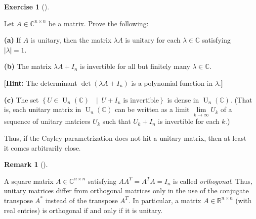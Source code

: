 \documentclass[numbers=enddot,12pt,final,onecolumn,notitlepage]{scrartcl}%
\newcounter{exer}
\numberwithin{exer}{subsection}
\theoremstyle{definition}
\newtheorem{remk}[theo]{Remark}
\newenvironment{remark}[1][]
{\begin{remk}[#1]\begin{leftbar}}
{\end{leftbar}\end{remk}}
\newtheorem{exmp}[exer]{Exercise}
\newenvironment{exercise}[1][]
{\begin{exmp}[#1]\begin{leftbar}}
{\end{leftbar}\end{exmp}}
\begin{document}
\begin{exercise}
\label{exe.unitary.skew-herm.2} Let $A\in\mathbb{C}^{n\times n}$ be a
matrix. Prove the following: \medskip

\textbf{(a)} If $A$ is unitary, then the matrix $\lambda A$ is unitary for
each $\lambda\in\mathbb{C}$ satisfying $\left\vert \lambda\right\vert =1$.
\medskip

\textbf{(b)} The matrix $\lambda A+I_{n}$ is invertible for all but finitely
many $\lambda\in\mathbb{C}$. \medskip

[\textbf{Hint:} The determinant $\det\left(  \lambda A+I_{n}\right)  $ is a
polynomial function in $\lambda$.] \medskip

\textbf{(c)} The set $\left\{  U\in\operatorname*{U}\nolimits_{n}\left(
\mathbb{C}\right)  \text{ }\mid\ U+I_{n}\text{ is invertible}\right\}  $ is
dense in $\operatorname*{U}\nolimits_{n}\left(  \mathbb{C}\right)  $. (That
is, each unitary matrix in $\operatorname*{U}\nolimits_{n}\left(
\mathbb{C}\right)  $ can be written as a limit $\lim\limits_{k\rightarrow
\infty}U_{k}$ of a sequence of unitary matrices $U_{k}$ such that $U_{k}%
+I_{n}$ is invertible for each $k$.)
\end{exercise}

Thus, if the Cayley parametrization does not hit a unitary matrix, then at
least it comes arbitrarily close.

\begin{remark}
A square matrix $A\in\mathbb{C}^{n\times n}$ satisfying $AA^{T}=A^{T}A=I_{n}$
is called \emph{orthogonal}. Thus, unitary matrices differ from orthogonal
matrices only in the use of the conjugate transpose $A^{\ast}$ instead of the
transpose $A^{T}$. In particular, a matrix $A\in\mathbb{R}^{n\times n}$ (with
real entries) is orthogonal if and only if it is unitary.
\end{remark}
\end{document}

